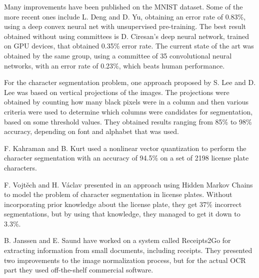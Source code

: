 Many improvements have been published on the MNIST dataset. Some of the more recent ones include L. Deng and D. Yu\cite{deng2011deep}, obtaining an error rate of 0.83\%, using a deep convex neural net with unsupervised pre-training. The best result obtained without using committees is D. Ciresan's deep neural network, trained on GPU devices\cite{Cire_an_2010}, that obtained 0.35\% error rate. The current state of the art was obtained by the same group, using a committee of 35 convolutional neural networks, with an error rate of 0.23\%, which beats human performance\cite{2012arXiv1202.2745C}. 

For the character segmentation problem, one approach proposed by S. Lee and D. Lee\cite{Dong_June_Lee} was based on vertical projections of the images. The projections were obtained by counting how many black pixels were in a column and then various criteria were used to determine which columns were candidates for segmentation, based on some threshold values. They obtained results ranging from 85\% to 98\% accuracy, depending on font and alphabet that was used. 

F. Kahraman and B. Kurt used a nonlinear vector quantization to perform the character segmentation\cite{kahraman2003license} with an accuracy of 94.5\% on a set of 2198 license plate characters. 

F. Vojtěch and H. Václav presented in \cite{Franc_2005} an approach using Hidden Markov Chains to model the problem of character segmentation in license plates. Without incorporating prior knowledge about the license plate, they get 37\% incorrect segmentations, but by using that knowledge, they managed to get it down to 3.3\%.

B. Janssen and E. Saund have worked on a system called Receipts2Go\cite{janssen2012receipts2go} for extracting information from small documents, including receipts. They presented two improvements to the image normalization process, but for the actual OCR part they used off-the-shelf commercial software. 